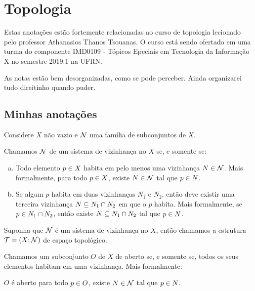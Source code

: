 \chapter{Topologia}
Estas anotações estão fortemente relacionadas ao curso de topologia lecionado pelo professor Athanasios Thanos Tsouanas. O curso está sendo ofertado em uma turma do componente IMD0109 - Tópicos Epeciais em Tecnologia da Informação X no semestre 2019.1 na UFRN.

As notas estão bem desorganizadas, como se pode perceber. Ainda organizarei tudo direitinho quando puder.

\section{Minhas anotações}

Considere $X$ não vazio e $\mathcal{N}$ uma família de subconjuntos de $X$. 

\begin{definition}
	Chamamos $\mathcal{N}$ de um sistema de vizinhança no $X$ se, e somente se:
\begin{enumerate}[a)]
\item
	Todo elemento $p \in X$ habita em pelo menos uma vizinhança $N \in \mathcal{N}$. Mais formalmente, para todo $p \in X$, existe $N \in \mathcal{N}$ tal que $p \in N$.

\item
	Se algum $p$ habita em duas vizinhanças $N_1$ e $N_2$, então deve existir uma terceira vizinhança $N \subseteq N_1 \cap N_2$ em que o $p$ habita. Mais formalmente, se $p \in N_1 \cap N_2$, então existe $N \subseteq N_1 \cap N_2$ tal que $p \in N$.
\end{enumerate}
\end{definition}

\begin{definition}
	Suponha que $\mathcal{N}$ é um sistema de vizinhança no $X$, então chamamos a estrutura $\mathcal{T} = (X ; \mathcal{N})$ de espaço topológico.
\end{definition}


\begin{definition}
	Chamamos um subconjunto $O$ de $X$ de aberto se, e somente se, todos os seus elementos habitam em uma vizinhança. Mais formalmente:
	\begin{center}
		$O$ é aberto \sse para todo $p \in O$, existe $N \in \mathcal{N}$ tal que $p \in N$.
	\end{center}
\end{definition}

